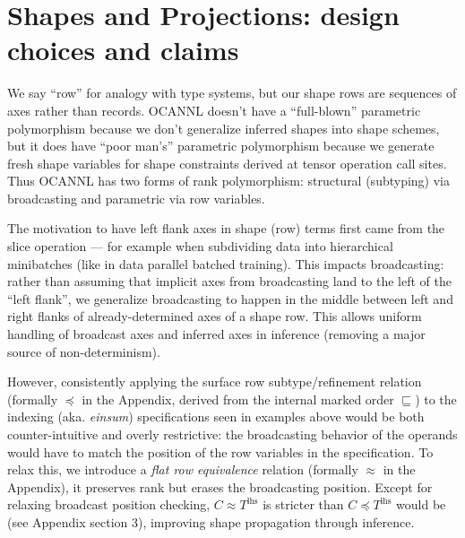 \documentclass[
  10pt,
  letterpaper,
]{article}
\begin{document}
\section{Shapes and Projections: design choices and
claims}\label{shapes-and-projections-design-choices-and-claims}

We say ``row'' for analogy with type systems, but our shape rows are
sequences of axes rather than records. OCANNL doesn't have a
``full-blown'' parametric polymorphism because we don't generalize
inferred shapes into shape schemes, but it does have ``poor man's''
parametric polymorphism because we generate fresh shape variables for
shape constraints derived at tensor operation call sites. Thus OCANNL
has two forms of rank polymorphism: structural (subtyping) via
broadcasting and parametric via row variables.

The motivation to have left flank axes in shape (row) terms first came
from the slice operation --- for example when subdividing data into
hierarchical minibatches (like in data parallel batched training). This
impacts broadcasting: rather than assuming that implicit axes from
broadcasting land to the left of the ``left flank'', we generalize
broadcasting to happen in the middle between left and right flanks of
already-determined axes of a shape row. This allows uniform handling of
broadcast axes and inferred axes in inference (removing a major source
of non-determinism).

However, consistently applying the surface row subtype/refinement
relation (formally \(\preceq\) in the Appendix, derived from the
internal marked order \(\sqsubseteq\)) to the indexing (aka.
\emph{einsum}) specifications seen in examples above would be both
counter-intuitive and overly restrictive: the broadcasting behavior of
the operands would have to match the position of the row variables in
the specification. To relax this, we introduce a \emph{flat row
equivalence} relation (formally \(\approx\) in the Appendix), it
preserves rank but erases the broadcasting position. Except for relaxing
broadcast position checking, \(C \approx T^{\mathrm{lhs}}\) is stricter
than \(C \preceq T^{\mathrm{lhs}}\) would be (see Appendix section 3),
improving shape propagation through inference.
\end{document}
